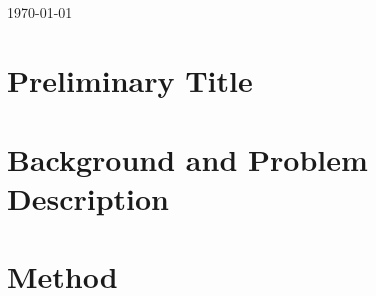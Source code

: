 \documentclass[12pt]{article} %
\begin{document}
\begin{titlepage}
\begin{figure}[!h]
      \label{fig:Triangulation}
\end{figure}

\begin{minipage}{0.4\textwidth}
\end{minipage}\\[1cm]
{\large \today}\\[3cm] %


\vfill %

\end{titlepage}



\newpage %


\section{Preliminary Title} %





\section{Background and Problem Description} %




\section{Method}

\end{document}
